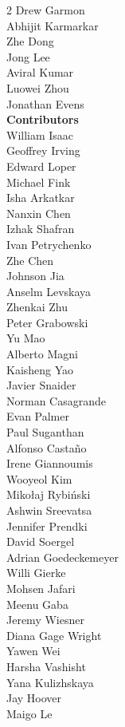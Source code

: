 \begin{multicols}{2}
Drew Garmon \\
Abhijit Karmarkar \\
Zhe Dong \\
Jong Lee \\
Aviral Kumar \\
Luowei Zhou \\
Jonathan Evens \\
\textbf{Contributors} \\
William Isaac \\
Geoffrey Irving \\
Edward Loper \\
Michael Fink \\
Isha Arkatkar \\
Nanxin Chen \\
Izhak Shafran \\
Ivan Petrychenko \\
Zhe Chen \\
Johnson Jia \\
Anselm Levskaya \\
Zhenkai Zhu \\
Peter Grabowski \\
Yu Mao \\
Alberto Magni \\
Kaisheng Yao \\
Javier Snaider \\
Norman Casagrande \\
Evan Palmer \\
Paul Suganthan \\
Alfonso Castaño  \\
Irene Giannoumis  \\
Wooyeol Kim  \\
Mikołaj Rybiński  \\
Ashwin Sreevatsa  \\
Jennifer Prendki \\
David Soergel \\
Adrian Goedeckemeyer  \\
Willi Gierke \\
Mohsen Jafari  \\
Meenu Gaba \\
Jeremy Wiesner  \\
Diana Gage Wright  \\
Yawen Wei  \\
Harsha Vashisht  \\
Yana Kulizhskaya  \\
Jay Hoover \\
Maigo Le \\

\end{multicols}
